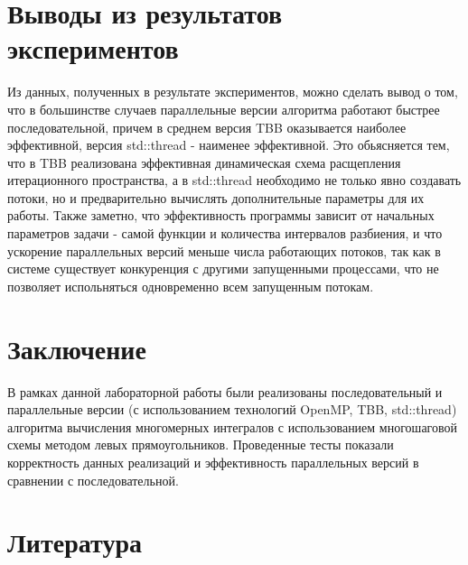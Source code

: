 \documentclass{report}
\begin{document}
\section*{Выводы из результатов экспериментов}

\par Из данных, полученных в результате экспериментов, можно сделать вывод о том, что в большинстве случаев параллельные версии алгоритма работают быстрее последовательной, причем в среднем версия TBB оказывается наиболее эффективной, версия std::thread - наименее эффективной. Это обьясняется тем, что в TBB реализована эффективная динамическая схема расщепления итерационного пространства, а в std::thread необходимо не только явно создавать потоки, но и предварительно вычислять дополнительные параметры для их работы. Также заметно, что эффективность программы зависит от начальных параметров задачи - самой функции и количества интервалов разбиения, и что ускорение параллельных версий меньше числа работающих потоков, так как в системе существует конкуренция с другими запущенными процессами, что не позволяет испольняться одновременно всем запущенным потокам.

\clearpage

\section*{Заключение}

\par В рамках данной лабораторной работы были реализованы последовательный и параллельные версии (с использованием технологий OpenMP, TBB, std::thread) алгоритма вычисления многомерных интегралов с использованием многошаговой схемы методом левых прямоугольников. Проведенные тесты показали корректность данных реализаций и эффективность параллельных версий в сравнении с последовательной.

\clearpage

\section*{Литература}
\end{document}
